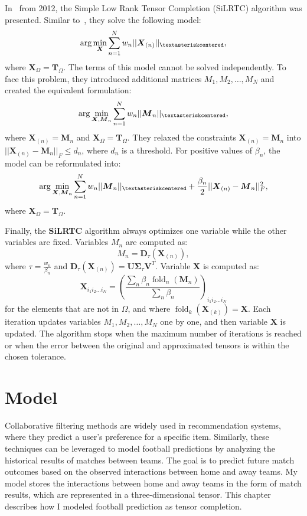 \documentclass[thesis=M,english]{FITthesis}[2019/12/23]
\DeclareMathOperator{\fold}{fold}
\begin{document}
In~\cite{silrtc} from 2012, the Simple Low Rank Tensor Completion (SiLRTC) algorithm was presented. Similar to~\cite{tncp}, they solve the following model: $$\arg \min_{\boldsymbol{X}} \sum_{n=1}^N w_n ||\boldsymbol{X}_{(n)}||_{\textasteriskcentered},$$ where $\boldsymbol{X}_\Omega = \boldsymbol{T}_\Omega$. The terms of this model cannot be solved independently. To face this problem, they introduced additional matrices $M_1, M_2, \dots, M_N$ and created the equivalent formulation: $$\arg \min_{\boldsymbol{X}, \boldsymbol{M}_n} \sum_{n=1}^N w_n ||\boldsymbol{M}_n||_{\textasteriskcentered},$$ where $\boldsymbol{X}_{(n)} = \boldsymbol{M}_n$ and $\boldsymbol{X}_\Omega = \boldsymbol{T}_\Omega$. They relaxed the constraints $\boldsymbol{X}_{(n)} = \boldsymbol{M}_n$ into $||\boldsymbol{X}_{(n)} - \boldsymbol{M}_n||_F \le d_n$, where $d_n$ is a threshold. For positive values of $\beta_n$, the model can be reformulated into: $$\arg \min_{\boldsymbol{X}, \boldsymbol{M}_n} \sum_{n=1}^N w_n ||\boldsymbol{M}_n||_{\textasteriskcentered} + \frac{\beta_n}{2}||\boldsymbol{X}_{(n)} - \boldsymbol{M}_n||_F^2,$$ where $\boldsymbol{X}_\Omega = \boldsymbol{T}_\Omega$.

Finally, the \textbf{SiLRTC} algorithm always optimizes one variable while the other variables are fixed. Variables $M_n$ are computed as: $$M_n = \boldsymbol{D}_\tau (\boldsymbol{X}_{(n)}),$$ where $\tau = \frac{w_n}{\beta_n}$ and $\boldsymbol{D}_\tau (\boldsymbol{X}_{(n)}) = \boldsymbol{U} \boldsymbol{\Sigma}_\tau \boldsymbol{V}^T$. Variable $\boldsymbol{X}$ is computed as: $$\boldsymbol{X}_{i_1 i_2 \dots i_N} = \left(\frac{\sum_n \beta_n \fold_n(\boldsymbol{M}_n)}{\sum_n \beta_n}\right)_{i_1 i_2 \dots i_N}$$ for the elements that are not in $\Omega$, and where $\fold_k(\boldsymbol{X}_{(k)}) = \boldsymbol{X}$. Each iteration updates variables $M_1, M_2, \dots, M_N$ one by one, and then variable $\boldsymbol{X}$ is updated. The algorithm stops when the maximum number of iterations is reached or when the error between the original and approximated tensors is within the chosen tolerance.

\chapter{Model}

Collaborative filtering methods are widely used in recommendation systems, where they predict a user's preference for a specific item. Similarly, these techniques can be leveraged to model football predictions by analyzing the historical results of matches between teams. The goal is to predict future match outcomes based on the observed interactions between home and away teams. My model stores the interactions between home and away teams in the form of match results, which are represented in a three-dimensional tensor. This chapter describes how I modeled football prediction as tensor completion.
\end{document}
